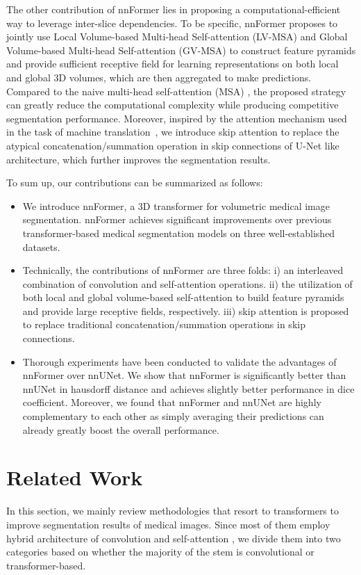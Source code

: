 \documentclass[journal,twoside,web]{ieeecolor}
\begin{document}
The other contribution of nnFormer lies in proposing a computational-efficient way to leverage inter-slice dependencies. To be specific, nnFormer proposes to jointly use Local Volume-based Multi-head Self-attention (LV-MSA) and Global Volume-based Multi-head Self-attention (GV-MSA) to construct feature pyramids and provide sufficient receptive field for learning representations on both local and global 3D volumes, which are then aggregated to make predictions. Compared to the naive multi-head self-attention (MSA) \cite{vaswani2017attention}, the proposed strategy can greatly reduce the computational complexity while producing competitive segmentation performance. Moreover, inspired by the attention mechanism used in the task of machine translation~\cite{vaswani2017attention}, we introduce skip attention to replace the atypical concatenation/summation operation in skip connections of U-Net like architecture, which further improves the segmentation results.



To sum up, our contributions can be summarized as follows:
\begin{itemize}
    \item We introduce nnFormer, a 3D transformer for volumetric medical image segmentation. nnFormer achieves significant improvements over previous transformer-based medical segmentation models on three well-established datasets.
    \item Technically, the contributions of nnFormer are three folds: i) an interleaved combination of convolution and self-attention operations. ii) the utilization of both local and global volume-based self-attention to build feature pyramids and provide large receptive fields, respectively. iii) skip attention is proposed to replace traditional concatenation/summation operations in skip connections.
    \item Thorough experiments have been conducted to validate the advantages of nnFormer over nnUNet. We show that nnFormer is significantly better than nnUNet in hausdorff distance and achieves slightly better performance in dice coefficient. Moreover, we found that nnFormer and nnUNet are highly complementary to each other as simply averaging their predictions can already greatly boost the overall performance.
\end{itemize}



\section{Related Work}
\label{sec:relatedwork}
In this section, we mainly review methodologies that resort to transformers to improve segmentation results of medical images. Since most of them employ hybrid architecture of convolution and self-attention \cite{vaswani2017attention}, we divide them into two categories based on whether the majority of the stem is convolutional or transformer-based.\\
\end{document}
